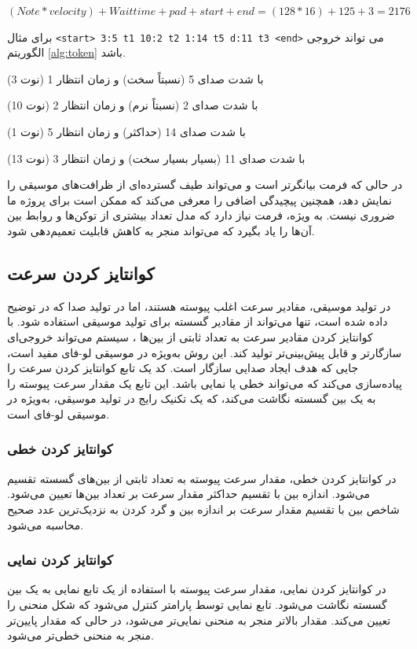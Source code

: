 $ (Note * velocity) + Wait  time + pad + start + end =(128 * 16) + 125 + 3 = 2176$
\begin{example}[]
      \centering
      \label{example:token}
      برای مثال \texttt{<start> 3:5 t1  10:2 t2  1:14 t5  d:11 t3 <end>} می تواند خروجی الگوریتم \ref{alg:token} باشد.

       (نوت 3) با شدت صدای 5 (نسبتاً سخت) و زمان انتظار 1

       (نوت 10) با شدت صدای 2 (نسبتاً نرم) و زمان انتظار 2

       (نوت 1) با شدت صدای 14 (حداکثر) و زمان انتظار 5

       (نوت 13) با شدت صدای 11 (بسیار بسیار سخت) و زمان انتظار 3
\end{example}

در حالی که فرمت  بیانگرتر است و می‌تواند طیف گسترده‌ای از ظرافت‌های
موسیقی را نمایش دهد، همچنین پیچیدگی اضافی را معرفی می‌کند  که ممکن است
برای پروژه ما ضروری نیست. به ویژه، فرمت  نیاز دارد که مدل تعداد
بیشتری از توکن‌ها و روابط بین آن‌ها را یاد بگیرد که می‌تواند منجر به
کاهش قابلیت تعمیم‌دهی شود.

\subsection{کوانتایز کردن
      سرعت}
در تولید موسیقی، مقادیر سرعت  اغلب پیوسته هستند، اما
در تولید صدا که در   توضیح داده شده است، تنها می‌تواند از مقادیر گسسته برای تولید موسیقی استفاده شود. با کوانتایز کردن
مقادیر سرعت به تعداد ثابتی از بین‌ها ، سیستم می‌تواند خروجی‌ای
سازگارتر و قابل پیش‌بینی‌تر تولید کند. این روش به‌ویژه در موسیقی لو-فای
مفید است، جایی که هدف ایجاد صدایی سازگار است. کد یک تابع
کوانتایز کردن سرعت را پیاده‌سازی می‌کند که می‌تواند خطی یا نمایی باشد. این
تابع یک مقدار سرعت پیوسته را به یک بین گسسته نگاشت می‌کند، که یک تکنیک
رایج در تولید موسیقی، به‌ویژه در موسیقی لو-فای است.

\subsubsection{کوانتایز کردن
      خطی}

در کوانتایز کردن خطی، مقدار سرعت پیوسته به تعداد ثابتی از بین‌های گسسته
تقسیم می‌شود. اندازه بین با تقسیم حداکثر مقدار سرعت بر تعداد بین‌ها تعیین
می‌شود. شاخص بین با تقسیم مقدار سرعت بر اندازه بین و گرد کردن به
نزدیک‌ترین عدد صحیح محاسبه می‌شود.

\subsubsection{کوانتایز کردن
      نمایی}
در کوانتایز کردن نمایی، مقدار سرعت پیوسته با استفاده از یک تابع نمایی به
یک بین گسسته نگاشت می‌شود. تابع نمایی توسط پارامتر  کنترل
می‌شود که شکل منحنی را تعیین می‌کند. مقدار بالاتر  منجر به
منحنی نمایی‌تر می‌شود، در حالی که مقدار پایین‌تر منجر به منحنی خطی‌تر می‌شود.


